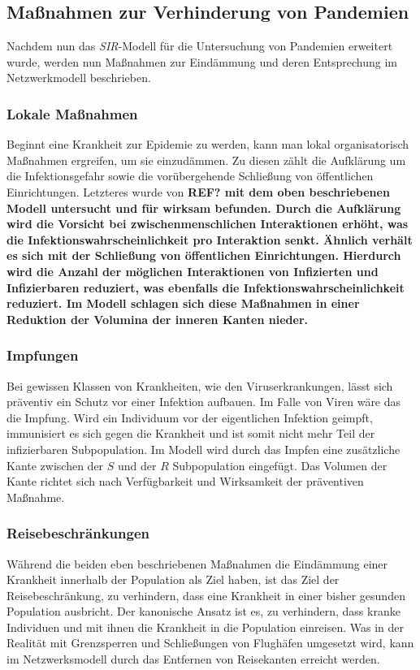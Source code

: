 \subsection{Maßnahmen zur Verhinderung von Pandemien}
Nachdem nun das \emph{SIR}-Modell für die Untersuchung von Pandemien erweitert wurde, werden nun Maßnahmen zur Eindämmung und deren Entsprechung im Netzwerkmodell beschrieben. 

\subsubsection{Lokale Maßnahmen}
Beginnt eine Krankheit zur Epidemie zu werden, kann man lokal organisatorisch Maßnahmen ergreifen, um sie einzudämmen. Zu diesen zählt die Aufklärung um die Infektionsgefahr sowie die vorübergehende Schließung von öffentlichen Einrichtungen. Letzteres wurde von \bf{REF?} mit dem oben beschriebenen Modell untersucht und für wirksam befunden. Durch die Aufklärung wird die Vorsicht bei zwischenmenschlichen Interaktionen erhöht, was die Infektionswahrscheinlichkeit pro Interaktion senkt. Ähnlich verhält es sich mit der Schließung von öffentlichen Einrichtungen. Hierdurch wird die Anzahl der möglichen Interaktionen von Infizierten und Infizierbaren reduziert, was ebenfalls die Infektionswahrscheinlichkeit reduziert. Im Modell schlagen sich diese Maßnahmen in einer Reduktion der Volumina der inneren Kanten nieder. 

\subsubsection{Impfungen}
Bei gewissen Klassen von Krankheiten, wie den Viruserkrankungen, lässt sich präventiv ein Schutz vor einer Infektion aufbauen. Im Falle von Viren wäre das die Impfung. Wird ein Individuum vor der eigentlichen Infektion geimpft, immunisiert es sich gegen die Krankheit und ist somit nicht mehr Teil der infizierbaren Subpopulation. Im Modell wird durch das Impfen eine zusätzliche Kante zwischen der $S$ und der $R$ Subpopulation eingefügt. Das Volumen der Kante richtet sich nach Verfügbarkeit und Wirksamkeit der präventiven Maßnahme.

\subsubsection{Reisebeschränkungen}
Während die beiden eben beschriebenen Maßnahmen die Eindämmung einer Krankheit innerhalb der Population als Ziel haben, ist das Ziel der Reisebeschränkung, zu verhindern, dass eine Krankheit in einer bisher gesunden Population ausbricht. Der kanonische Ansatz ist es, zu verhindern, dass kranke Individuen und mit ihnen die Krankheit in die Population einreisen. Was in der Realität mit Grenzsperren und Schließungen von Flughäfen umgesetzt wird, kann im Netzwerksmodell durch das Entfernen von Reisekanten erreicht werden. %

